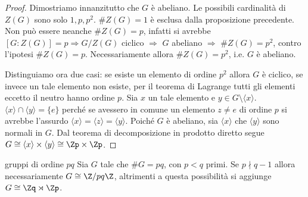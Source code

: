 \begin{proof}
    Dimostriamo innanzitutto che $G$ è abeliano. Le possibili cardinalità di $Z(G)$ sono solo $1, p, p^2$. $\#Z(G) = 1$ è esclusa dalla proposizione precedente. Non può essere neanche $\#Z(G) = p$, infatti si avrebbe $[G : Z(G)] = p \Rightarrow G/Z(G)$ ciclico $\Rightarrow$ $G$ abeliano $\Rightarrow$ $\#Z(G) = p^2$, contro l'ipotesi $\#Z(G) = p$. Necessariamente allora $\#Z(G) = p^2$, i.e. $G$ è abeliano.
    
    Distinguiamo ora due casi: se esiste un elemento di ordine $p^2$ allora $G$ è ciclico, se invece un tale elemento non esiste, per il teorema di Lagrange tutti gli elementi eccetto il neutro hanno ordine $p$. Sia $x$ un tale elemento e $y \in G \setminus \langle x \rangle$. $\langle x \rangle\cap \langle y \rangle = \{e\}$ perché se avessero in comune un elemento $z \neq e$ di ordine $p$ si avrebbe l'assurdo $\langle x \rangle = \langle z \rangle = \langle y \rangle$. Poiché $G$ è abeliano, sia $\langle x \rangle$ che $\langle y \rangle$ sono normali in $G$. Dal teorema di decomposizione in prodotto diretto segue $G \cong \langle x \rangle \times \langle y \rangle \cong \Zp \times \Zp$.
\end{proof}
\begin{proposition}{gruppi di ordine $pq$}
    Sia $G$ tale che $\#G = pq$, con $p < q$ primi. Se $p \nmid q-1$ allora necessariamente $G \cong \Z/pq\Z$, altrimenti a questa possibilità si aggiunge $G \cong  \Zq \rtimes \Zp$.
\end{proposition}
